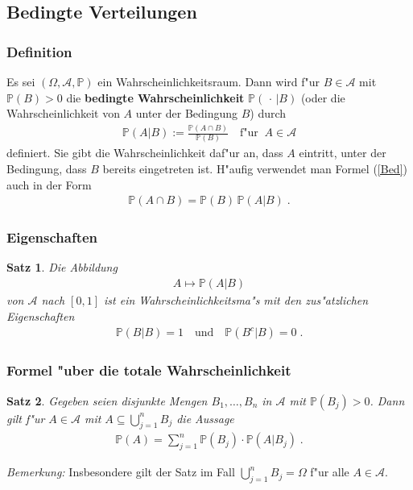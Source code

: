\documentclass[ngerman,draft,parskip=half,twoside]{scrartcl}
\newtheorem{thm}{Satz}[section]
\newcommand*{\Algeb}{\mathcal{A}}   %
\newcommand*{\WKM}{\mathbb{P}}      %
\begin{document}
\subsection{Bedingte Verteilungen}
\subsubsection{Definition}
Es sei $(\Omega,\Algeb,\WKM)$ ein Wahrscheinlichkeitsraum. Dann wird
f"ur $B\in \Algeb$ mit $\WKM(B)>0$ die \textbf{bedingte Wahrscheinlichkeit} $\WKM(\,\cdot\,|B)$
(oder die Wahrscheinlichkeit von $A$ unter der Bedingung $B$)
durch
\begin{gather}
\label{Bed}
 \WKM(A|B):=\frac{\WKM(A\cap B)}{\WKM(B)}\quad\mbox{f"ur}\;\;A\in\Algeb
\end{gather}
definiert. Sie gibt die Wahrscheinlichkeit daf"ur an, dass $A$
eintritt, unter der Bedingung, dass $B$ bereits eingetreten ist. H"aufig verwendet man
Formel (\ref{Bed}) auch in der Form
\begin{gather*}
  \WKM(A\cap B)= \WKM(B)\,\WKM(A|B)\;.
\end{gather*}
\subsubsection{Eigenschaften}
\begin{thm}
Die Abbildung
  \begin{gather*}
    A\mapsto \WKM(A|B)
  \end{gather*}
von $\Algeb$ nach $[0,1]$ ist ein Wahrscheinlichkeitsma"s mit den zus"atzlichen Eigenschaften
  \begin{gather*}
    \WKM(B|B)=1\quad\mbox{und}\quad\WKM(B^c|B)=0\;.
  \end{gather*}
\end{thm}
\subsubsection{Formel "uber die totale Wahrscheinlichkeit}
\begin{thm}
\label{total}
Gegeben seien disjunkte Mengen $B_1,\ldots,B_n$ in $\Algeb$ mit
$\WKM(B_j)>0$. Dann gilt f"ur $A\in \Algeb$ mit $A\subseteq\bigcup_{j=1}^n B_j$
die Aussage
  \begin{gather*}
    \WKM(A)=\sum_{j=1}^n\WKM(B_j)\cdot\WKM(A|B_j)\;.
  \end{gather*}
\end{thm}
\textit{Bemerkung:} Insbesondere gilt der Satz im Fall $\bigcup_{j=1}^n B_j=\Omega$
f"ur alle $A\in\Algeb$.
\end{document}
